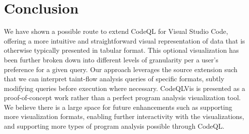 \documentclass[sigplan,10pt,review]{acmart}
\begin{document}
\section{Conclusion}
We have shown a possible route to extend CodeQL for Visual Studio Code, offering a more intuitive and straightforward visual representation of data that is otherwise typically presented in tabular format. This optional visualization has been further broken down into different levels of granularity per a user's preference for a given query. Our approach leverages the source extension such that we can interpret taint-flow analysis queries of specific formats, subtly modifying queries before execution where necessary.
\newline
\indent
CodeQLVis is presented as a proof-of-concept work rather than a perfect program analysis visualization tool. We believe there is a large space for future enhancements such as supporting more visualization formats, enabling further interactivity with the visualizations, and supporting more types of program analysis possible through CodeQL. 


\end{document}
